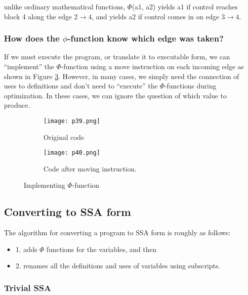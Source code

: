 unlike ordinary mathematical functions, $\Phi$(a1, a2) yields a1 if control reaches block 4 along the edge $2 \rightarrow 4$, and yields a2 if control comes in on edge $3 \rightarrow 4$.


\subsubsection{How does the $\phi$-function know which edge was taken?}


If we must execute the program, or translate it to executable form, we can “implement” the $\Phi$-function using a move instruction on each incoming edge as shown in Figure \ref{fig:p39-40}. However, in many cases, we simply need the connection of uses to definitions and don’t need to “execute” the $\Phi$-functions during optimization. In these cases, we can ignore the question of which value to produce.

\begin{figure}[htb]
     \centering
     \begin{subfigure}{0.3\textwidth}
     \centering
         \texttt{[image: p39.png]}
         \caption{Original code}
         \label{fig:p39}
     \end{subfigure}
     \begin{subfigure}{0.3\textwidth}
     \centering
         \texttt{[image: p40.png]}
         \caption{Code after moving instruction.}
         \label{fig:p40}
     \end{subfigure}
        \caption{Implementing $\Phi$-function}
        \label{fig:p39-40}
\end{figure}




\subsection{Converting to SSA form}

The algorithm for converting a program to SSA form is roughly as follows:

\begin{itemize}
    \item 1. adds $\Phi$ functions for the variables, and then
    \item 2. renames all the definitions and uses of variables using subscripts.
\end{itemize}




\subsubsection{Trivial SSA}

